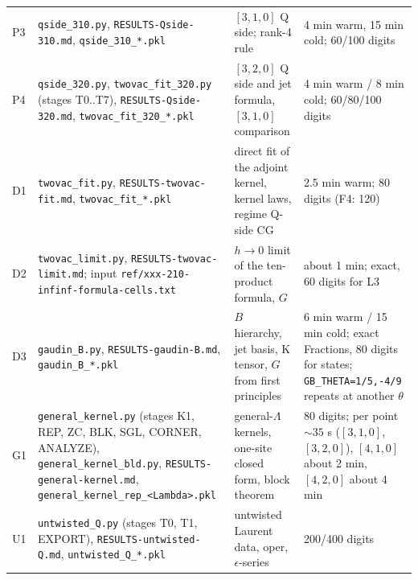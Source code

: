 \documentclass[11pt]{article}
\begin{document}
{\begin{longtable}{p{1.0cm}p{4.2cm}p{4.6cm}p{3.6cm}}
P3 & \texttt{qside\_\allowbreak{}310.\allowbreak{}py}, \texttt{RESULTS-\allowbreak{}Qside-\allowbreak{}310.\allowbreak{}md}, \texttt{qside\_\allowbreak{}310\_\allowbreak{}*.\allowbreak{}pkl} & $[3,1,0]$ Q side; rank-4 rule & 4 min warm, 15 min cold; 60/100 digits \\
P4 & \texttt{qside\_\allowbreak{}320.\allowbreak{}py}, \texttt{twovac\_\allowbreak{}fit\_\allowbreak{}320.\allowbreak{}py} (stages T0..T7), \texttt{RESULTS-\allowbreak{}Qside-\allowbreak{}320.\allowbreak{}md}, \texttt{twovac\_\allowbreak{}fit\_\allowbreak{}320\_\allowbreak{}*.\allowbreak{}pkl} & $[3,2,0]$ Q side and jet formula, $[3,1,0]$ comparison & 4 min warm / 8 min cold; 60/80/100 digits \\
D1 & \texttt{twovac\_\allowbreak{}fit.\allowbreak{}py}, \texttt{RESULTS-\allowbreak{}twovac-\allowbreak{}fit.\allowbreak{}md}, \texttt{twovac\_\allowbreak{}fit\_\allowbreak{}*.\allowbreak{}pkl} & direct fit of the adjoint kernel, kernel laws, regime Q-side CG & 2.5 min warm; 80 digits (F4: 120) \\
D2 & \texttt{twovac\_\allowbreak{}limit.\allowbreak{}py}, \texttt{RESULTS-\allowbreak{}twovac-\allowbreak{}limit.\allowbreak{}md}; input \texttt{ref/\allowbreak{}xxx-\allowbreak{}210-\allowbreak{}infinf-\allowbreak{}formula-\allowbreak{}cells.\allowbreak{}txt} & $h\to0$ limit of the ten-product formula, $G$ & about 1 min; exact, 60 digits for L3 \\
D3 & \texttt{gaudin\_\allowbreak{}B.\allowbreak{}py}, \texttt{RESULTS-\allowbreak{}gaudin-\allowbreak{}B.\allowbreak{}md}, \texttt{gaudin\_\allowbreak{}B\_\allowbreak{}*.\allowbreak{}pkl} & $B$ hierarchy, jet basis, K tensor, $G$ from first principles & 6 min warm / 15 min cold; exact Fractions, 80 digits for states; \texttt{GB\_\allowbreak{}THETA=1/\allowbreak{}5,-\allowbreak{}4/\allowbreak{}9} repeats at another $\theta$ \\
G1 & \texttt{general\_\allowbreak{}kernel.\allowbreak{}py} (stages K1, REP, ZC, BLK, SGL, CORNER, ANALYZE), \texttt{general\_\allowbreak{}kernel\_\allowbreak{}bld.\allowbreak{}py}, \texttt{RESULTS-\allowbreak{}general-\allowbreak{}kernel.\allowbreak{}md}, \texttt{general\_\allowbreak{}kernel\_\allowbreak{}rep\_\allowbreak{}<Lambda>.\allowbreak{}pkl} & general-$\Lambda$ kernels, one-site closed form, block theorem & 80 digits; per point $\sim35$ s ($[3,1,0]$, $[3,2,0]$), $[4,1,0]$ about 2 min, $[4,2,0]$ about 4 min \\
U1 & \texttt{untwisted\_\allowbreak{}Q.\allowbreak{}py} (stages T0, T1, EXPORT), \texttt{RESULTS-\allowbreak{}untwisted-\allowbreak{}Q.\allowbreak{}md}, \texttt{untwisted\_\allowbreak{}Q\_\allowbreak{}*.\allowbreak{}pkl} & untwisted Laurent data, oper, $\epsilon$-series & 200/400 digits \\

\end{longtable}}
\end{document}
